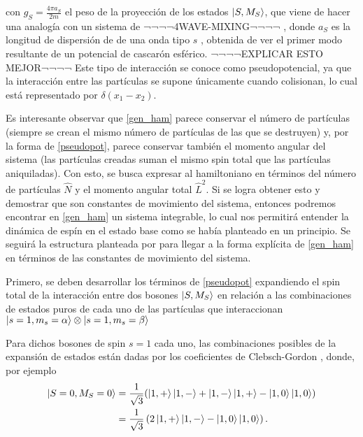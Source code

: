 con $g_S = \frac{4\pi a_S}{2m}$ el peso de la proyección de los estados $\left|S,M_S\right\rangle$, que viene de hacer una analogía con un sistema de  ¬¬¬¬4WAVE-MIXING¬¬¬¬ \cite{g_smodel}, donde $a_S$ es la longitud de dispersión de de una onda tipo $s$ \cite{s-wave}, obtenida de ver el primer modo resultante de un potencial de cascarón esférico. ¬¬¬¬EXPLICAR ESTO MEJOR¬¬¬¬  
Este tipo de interacción se conoce como pseudopotencial, ya que la interacción entre las partículas se supone únicamente cuando colisionan, lo cual está representado por $\delta(x_1-x_2)$. 
 

Es interesante observar que \ref{gen_ham} parece conservar el número de partículas (siempre se crean el mismo número de partículas de las que se destruyen) y, por la forma de \ref{pseudopot}, parece conservar también el momento angular del sistema (las partículas creadas suman el mismo spin total que las partículas aniquiladas). %
Con esto, se busca expresar al hamiltoniano en términos del número de partículas $\hat{N}$ y el momento angular total $\hat{L}^2$. Si se logra obtener esto y demostrar que son constantes de movimiento del sistema, entonces podremos encontrar en \ref{gen_ham} un sistema integrable, lo cual nos permitirá entender la dinámica de espín en el estado base como se había planteado en un principio. Se seguirá la estructura planteada por \cite{law98} para llegar a la forma explícita de \ref{gen_ham} en términos de las constantes de movimiento del sistema. 

Primero, se deben desarrollar los términos de \ref{pseudopot} expandiendo el spin total de la interacción entre dos bosones $\left|S,M_S\right\rangle$ en relación a las combinaciones de estados puros de cada uno de las partículas que interaccionan $\left|s=1,m_s=\alpha\right\rangle \mathbin{\mathop{\otimes}} \left|s=1,m_s=\beta\right\rangle$

Para dichos bosones de spin $s=1$ cada uno, las combinaciones posibles de la expansión de estados están dadas por los coeficientes de Clebsch-Gordon \cite{griffiths}, donde, por ejemplo
\begin{equation*}
\begin{split}
\left|S=0,M_S=0\right\rangle = \frac{1}{\sqrt{3}} &  ( \left|1,+\right\rangle\left|1,-\right\rangle + \left|1,-\right\rangle\left|1,+\right\rangle - \left|1,0\right\rangle\left|1,0\right\rangle ) \\ 
 = \frac{1}{\sqrt{3}} & \left( 2\left|1,+\right\rangle\left|1,-\right\rangle - \left|1,0\right\rangle\left|1,0\right\rangle \right).
\end{split}
\end{equation*}

